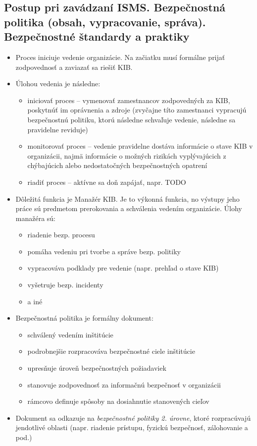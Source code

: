 \documentclass[12pt,a4paper]{article}
\begin{document}
{    \subsection{Postup pri zavádzaní ISMS. Bezpečnostná politika (obsah, vypracovanie, správa). Bezpečnostné štandardy a praktiky}
    \begin{itemize}
        \item Proces iniciuje vedenie organizácie. Na začiatku musí formálne prijať zodpovednosť a zaviazať sa riešiť KIB.
        \item Úlohou vedenia je následne:
        \begin{itemize}
            \item iniciovať proces -- vymenovať zamestnancov zodpovedných za KIB, poskytnúť im oprávnenia a zdroje (zvyčajne títo zamestnanci vypracujú bezpečnostnú politiku, ktorú následne schvaľuje vedenie, následne sa pravidelne reviduje)
            \item monitorovať proces -- vedenie pravidelne dostáva informácie o stave KIB v organizácii, najmä informácie o možných rizikách vyplývajúcich z chýbajúcich alebo nedostatočných bezpečnostných opatrení
            \item riadiť proces -- aktívne sa doň zapájať, napr. TODO
        \end{itemize}
        \item Dôležitá funkcia je Manažér KIB. Je to výkonná funkcia, no výstupy jeho práce sú predmetom prerokovania a schválenia vedením organizácie. Úlohy manažéra sú:
        \begin{itemize}
            \item riadenie bezp. procesu
            \item pomáha vedeniu pri tvorbe a správe bezp. politiky
            \item vypracováva podklady pre vedenie (napr. prehľad o stave KIB)
            \item vyšetruje bezp. incidenty
            \item a iné
        \end{itemize}
        \item Bezpečnostná politika je formálny dokument:
        \begin{itemize}
            \item schválený vedením inštitúcie
            \item podrobnejšie rozpracováva bezpečnostné ciele inštitúcie
            \item upresňuje úroveň bezpečnostných požiadaviek
            \item stanovuje zodpovednosť za informačnú bezpečnosť v organizácii
            \item rámcovo definuje spôsoby na dosiahnutie stanovených cieľov
        \end{itemize}
        \item Dokument sa odkazuje na \textit{bezpečnostné politiky 2. úrovne}, ktoré rozpracúvajú jendotlivé oblasti (napr. riadenie prístupu, fyzickú bezpečnosť, zálohovanie a pod.) 
    \end{itemize}
}
\end{document}
